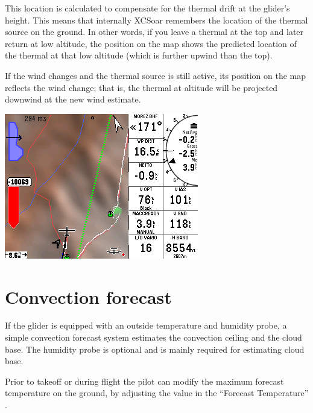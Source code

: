 \documentclass[a4paper,12pt]{refrep}
\begin{document}
  This location is calculated to compensate for the thermal drift at
  the glider's height.  This means that internally XCSoar remembers
  the location of the thermal source on the ground.  In other words,
  if you leave a thermal at the top and later return at low altitude,
  the position on the map shows the predicted location of the thermal
  at that low altitude (which is further upwind than the top).  

  If the wind changes and the thermal source is still active, its
  position on the map reflects the wind change; that is, the thermal
  at altitude will be projected downwind at the new wind estimate.

\begin{center}
\includegraphics[angle=0,width=\linewidth,keepaspectratio='true']{figures/shot-tlocator-cruise.png}
\end{center}

\section{Convection forecast}\label{sec:convection-forecast}

If the glider is equipped with an outside temperature and humidity
probe, a simple convection forecast system estimates the convection
ceiling and the cloud base.  The humidity probe is optional and is
mainly required for estimating cloud base.

Prior to takeoff or during flight the pilot can modify the maximum
forecast temperature on the ground, by adjusting the value in the
``Forecast Temperature'' {\InfoBox}.
\end{document}
